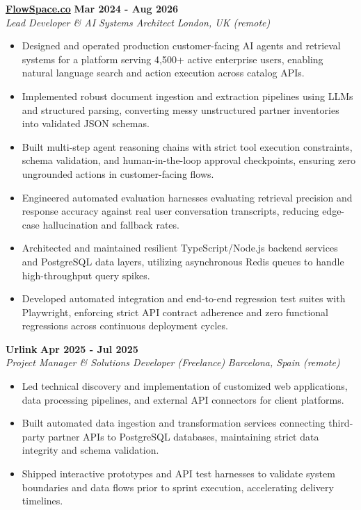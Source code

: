 \documentclass[10pt,a4paper]{article}
\newcommand{\role}[4]{%
  \textbf{#1} \hfill \textbf{#2}\\[1pt]%
  \textit{#3} \hfill \textit{#4}\\[2pt]%
}
\begin{document}
\role{\href{https://flowspace.co}{FlowSpace.co}}{Mar 2024 - Aug 2026}{Lead Developer \& AI Systems Architect}{London, UK (remote)}
\begin{itemize}
  \item Designed and operated production customer-facing AI agents and retrieval systems for a platform serving 4,500+ active enterprise users, enabling natural language search and action execution across catalog APIs.
  \item Implemented robust document ingestion and extraction pipelines using LLMs and structured parsing, converting messy unstructured partner inventories into validated JSON schemas.
  \item Built multi-step agent reasoning chains with strict tool execution constraints, schema validation, and human-in-the-loop approval checkpoints, ensuring zero ungrounded actions in customer-facing flows.
  \item Engineered automated evaluation harnesses evaluating retrieval precision and response accuracy against real user conversation transcripts, reducing edge-case hallucination and fallback rates.
  \item Architected and maintained resilient TypeScript/Node.js backend services and PostgreSQL data layers, utilizing asynchronous Redis queues to handle high-throughput query spikes.
  \item Developed automated integration and end-to-end regression test suites with Playwright, enforcing strict API contract adherence and zero functional regressions across continuous deployment cycles.
\end{itemize}

\role{Urlink}{Apr 2025 - Jul 2025}{Project Manager \& Solutions Developer (Freelance)}{Barcelona, Spain (remote)}
\begin{itemize}
  \item Led technical discovery and implementation of customized web applications, data processing pipelines, and external API connectors for client platforms.
  \item Built automated data ingestion and transformation services connecting third-party partner APIs to PostgreSQL databases, maintaining strict data integrity and schema validation.
  \item Shipped interactive prototypes and API test harnesses to validate system boundaries and data flows prior to sprint execution, accelerating delivery timelines.
\end{itemize}
\end{document}
